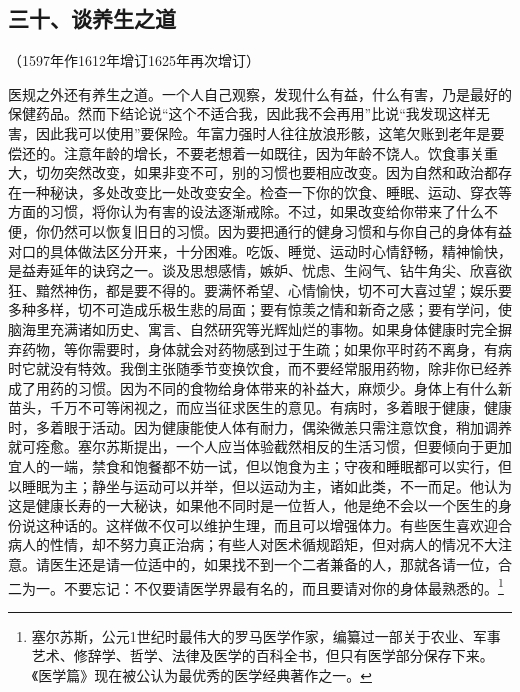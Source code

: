 \subsection*{三十、谈养生之道}
\begin{center}
    （1597年作1612年增订1625年再次增订）
\end{center}
\par 医规之外还有养生之道。一个人自己观察，发现什么有益，什么有害，乃是最好的保健药品。然而下结论说“这个不适合我，因此我不会再用”比说“我发现这样无害，因此我可以使用”要保险。年富力强时人往往放浪形骸，这笔欠账到老年是要偿还的。注意年龄的增长，不要老想着一如既往，因为年龄不饶人。饮食事关重大，切勿突然改变，如果非变不可，别的习惯也要相应改变。因为自然和政治都存在一种秘诀，多处改变比一处改变安全。检查一下你的饮食、睡眠、运动、穿衣等方面的习惯，将你认为有害的设法逐渐戒除。不过，如果改变给你带来了什么不便，你仍然可以恢复旧日的习惯。因为要把通行的健身习惯和与你自己的身体有益对口的具体做法区分开来，十分困难。吃饭、睡觉、运动时心情舒畅，精神愉快，是益寿延年的诀窍之一。谈及思想感情，嫉妒、忧虑、生闷气、钻牛角尖、欣喜欲狂、黯然神伤，都是要不得的。要满怀希望、心情愉快，切不可大喜过望；娱乐要多种多样，切不可造成乐极生悲的局面；要有惊羡之情和新奇之感；要有学问，使脑海里充满诸如历史、寓言、自然研究等光辉灿烂的事物。如果身体健康时完全摒弃药物，等你需要时，身体就会对药物感到过于生疏；如果你平时药不离身，有病时它就没有特效。我倒主张随季节变换饮食，而不要经常服用药物，除非你已经养成了用药的习惯。因为不同的食物给身体带来的补益大，麻烦少。身体上有什么新苗头，千万不可等闲视之，而应当征求医生的意见。有病时，多着眼于健康，健康时，多着眼于活动。因为健康能使人体有耐力，偶染微恙只需注意饮食，稍加调养就可痊愈。塞尔苏斯提出，一个人应当体验截然相反的生活习惯，但要倾向于更加宜人的一端，禁食和饱餐都不妨一试，但以饱食为主；守夜和睡眠都可以实行，但以睡眠为主；静坐与运动可以并举，但以运动为主，诸如此类，不一而足。他认为这是健康长寿的一大秘诀，如果他不同时是一位哲人，他是绝不会以一个医生的身份说这种话的。这样做不仅可以维护生理，而且可以增强体力。有些医生喜欢迎合病人的性情，却不努力真正治病；有些人对医术循规蹈矩，但对病人的情况不大注意。请医生还是请一位适中的，如果找不到一个二者兼备的人，那就各请一位，合二为一。不要忘记：不仅要请医学界最有名的，而且要请对你的身体最熟悉的。\footnote{塞尔苏斯，公元1世纪时最伟大的罗马医学作家，编纂过一部关于农业、军事艺术、修辞学、哲学、法律及医学的百科全书，但只有医学部分保存下来。《医学篇》现在被公认为最优秀的医学经典著作之一。}



